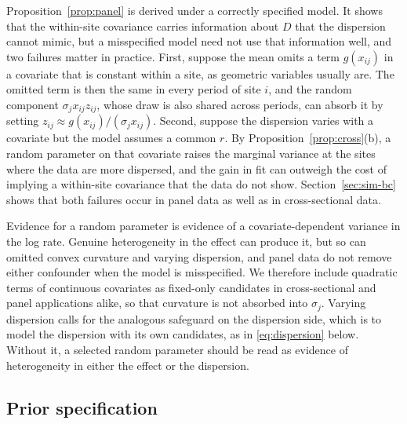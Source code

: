 Proposition~\ref{prop:panel} is derived under a correctly specified model. It shows that the within-site covariance carries information about $D$ that the dispersion cannot mimic, but a misspecified model need not use that information well, and two failures matter in practice. First, suppose the mean omits a term $g(x_{ij})$ in a covariate that is constant within a site, as geometric variables usually are. The omitted term is then the same in every period of site $i$, and the random component $\sigma_jx_{ij}z_{ij}$, whose draw is also shared across periods, can absorb it by setting $z_{ij}\approx g(x_{ij})/(\sigma_jx_{ij})$. Second, suppose the dispersion varies with a covariate but the model assumes a common $r$. By Proposition~\ref{prop:cross}(b), a random parameter on that covariate raises the marginal variance at the sites where the data are more dispersed, and the gain in fit can outweigh the cost of implying a within-site covariance that the data do not show. Section~\ref{sec:sim-bc} shows that both failures occur in panel data as well as in cross-sectional data.

\begin{remark}\label{rem:practice}
Evidence for a random parameter is evidence of a covariate-dependent variance in the log rate. Genuine heterogeneity in the effect can produce it, but so can omitted convex curvature and varying dispersion, and panel data do not remove either confounder when the model is misspecified. We therefore include quadratic terms of continuous covariates as fixed-only candidates in cross-sectional and panel applications alike, so that curvature is not absorbed into $\sigma_j$. Varying dispersion calls for the analogous safeguard on the dispersion side, which is to model the dispersion with its own candidates, as in \eqref{eq:dispersion} below. Without it, a selected random parameter should be read as evidence of heterogeneity in either the effect or the dispersion.
\end{remark}

\subsection{Prior specification}\label{sec:prior}


